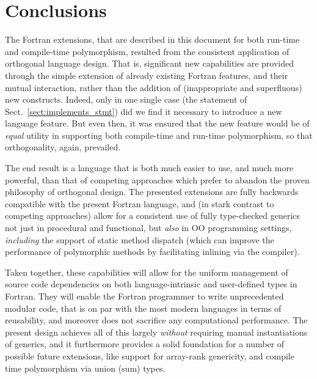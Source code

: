 \documentclass[11pt,oneside]{report}
\newcommand{\code}[1]{{\selectfont\ttfamily{#1}}}
\begin{document}
\chapter{Conclusions}

The Fortran extensions, that are described in this document for both
run-time and compile-time polymorphism, resulted from the consistent
application of orthogonal language design. That is, significant new
capabilities are provided through the simple extension of already
existing Fortran features, and their mutual interaction, rather than
the addition of (inappropriate and superfluous) new
constructs. Indeed, only in one single case (the \code{implements}
statement of Sect.~\ref{sect:implements_stmt}) did we find it
necessary to introduce a new language feature. But even then, it was
ensured that the new feature would be of \emph{equal} utility in
supporting both compile-time and run-time polymorphism, so that
orthogonality, again, prevailed.

The end result is a language that is both much easier to use, and much
more powerful, than that of competing approaches which prefer to
abandon the proven philosophy of orthogonal design. The presented
extensions are fully backwards compatible with the present Fortran
language, and (in stark contrast to competing approaches) allow for a
consistent use of fully type-checked generics not just in procedural
and functional, but \emph{also} in OO programming settings,
\emph{including} the support of static method dispatch (which can
improve the performance of polymorphic methods by facilitating
inlining via the compiler).

Taken together, these capabilities will allow for the uniform
management of source code dependencies on both language-intrinsic and
user-defined types in Fortran. They will enable the Fortran programmer
to write unprecedented modular code, that is on par with the most
modern languages in terms of reusability, and moreover does not
sacrifice any computational performance. The present design achieves
all of this largely \emph{without} requiring manual instantiations of
generics, and it furthermore provides a solid foundation for a number
of possible future extensions, like support for array-rank genericity,
and compile time polymorphism via union (sum) types.

\printbibliography

\renewcommand{\abstractname}{Acknowledgements}
\end{document}
